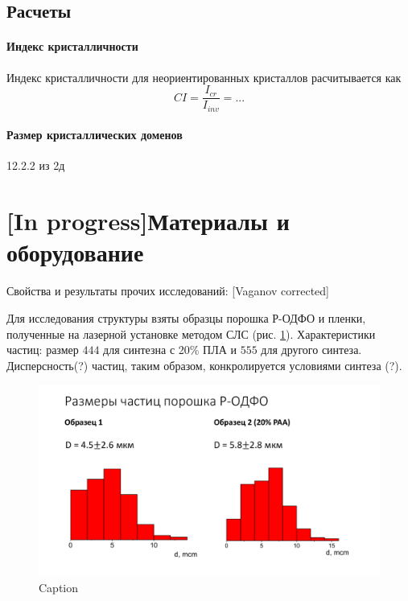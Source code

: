\subsection{Расчеты}



\paragraph{Индекс кристалличности}

Индекс кристалличности для неориентированных кристаллов расчитывается как
\begin{equation}
    CI = \frac{I_{cr}}{I_{inv} } = ...
    \end{equation}

\paragraph{Размер кристаллических доменов}

12.2.2 из 2д




\section{[In progress]Материалы и оборудование}
	Свойства и результаты прочих исследований:
	[Vaganov corrected]


Для исследования структуры взяты образцы порошка Р-ОДФО и пленки, полученные на лазерной установке методом СЛС (рис. \ref{fig:particles}).
Характеристики частиц: размер $444$ для синтезна с 20\% ПЛА и $555$  для другого синтеза. Дисперсность(?) частиц, таким образом, конкролируется условиями синтеза (?).
	
	\begin{figure}[h]
	    \centering
	    \includegraphics[width=\linewidth]{fig/particles}
	    \caption{Caption}
	    \label{fig:particles}
	\end{figure}
	

